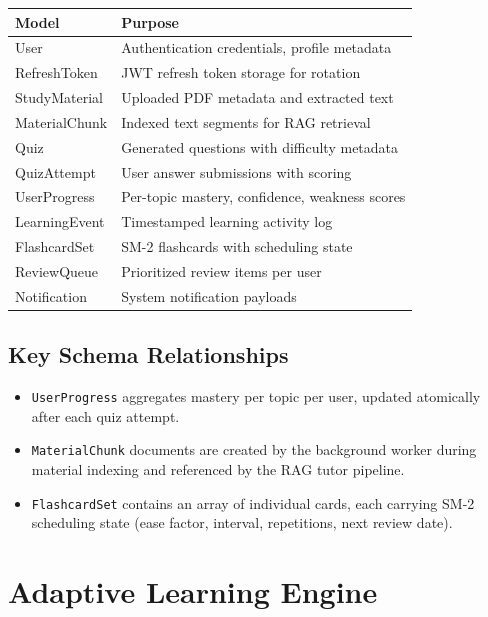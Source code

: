 \documentclass[12pt,a4paper]{article}
\begin{document}
\begin{longtable}{p{4cm} p{10cm}}
\toprule
\textbf{Model} & \textbf{Purpose} \\
\midrule
User & Authentication credentials, profile metadata \\
RefreshToken & JWT refresh token storage for rotation \\
StudyMaterial & Uploaded PDF metadata and extracted text \\
MaterialChunk & Indexed text segments for RAG retrieval \\
Quiz & Generated questions with difficulty metadata \\
QuizAttempt & User answer submissions with scoring \\
UserProgress & Per-topic mastery, confidence, weakness scores \\
LearningEvent & Timestamped learning activity log \\
FlashcardSet & SM-2 flashcards with scheduling state \\
ReviewQueue & Prioritized review items per user \\
Notification & System notification payloads \\
\bottomrule
\end{longtable}

\subsection{Key Schema Relationships}
\begin{itemize}[leftmargin=1.5cm]
    \item \texttt{UserProgress} aggregates mastery per topic per user, updated atomically after each quiz attempt.
    \item \texttt{MaterialChunk} documents are created by the background worker during material indexing and referenced by the RAG tutor pipeline.
    \item \texttt{FlashcardSet} contains an array of individual cards, each carrying SM-2 scheduling state (ease factor, interval, repetitions, next review date).
\end{itemize}

\section{Adaptive Learning Engine}
\end{document}
